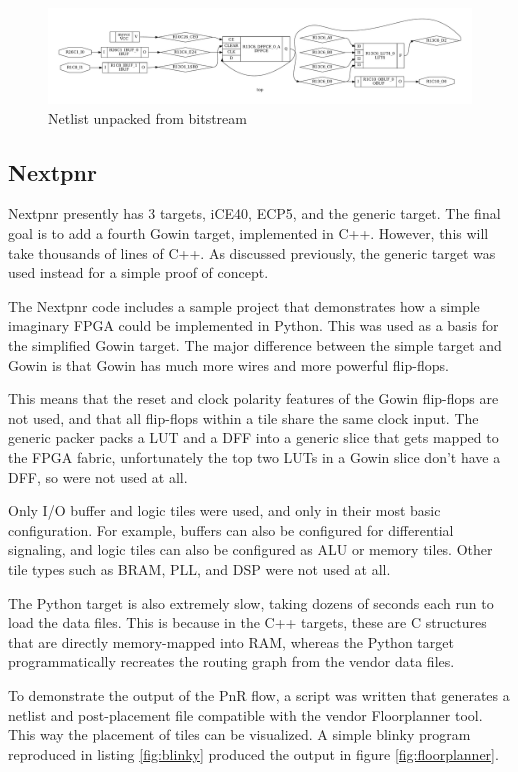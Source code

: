 \documentclass{article}
\begin{document}
\begin{figure}
    \centering
    \includegraphics[width=\textwidth]{fig/post_pnr.pdf}
    \caption{Netlist unpacked from bitstream}
    \label{fig:postpnr}
\end{figure}

\subsection{Nextpnr}

Nextpnr presently has 3 targets, iCE40, ECP5, and the generic target. The final goal is to add a fourth Gowin target, implemented in C++. However, this will take thousands of lines of C++. As discussed previously, the generic target was used instead for a simple proof of concept.

The Nextpnr code includes a sample project that demonstrates how a simple imaginary FPGA could be implemented in Python. This was used as a basis for the simplified Gowin target. The major difference between the simple target and Gowin is that Gowin has much more wires and more powerful flip-flops.

This means that the reset and clock polarity features of the Gowin flip-flops are not used, and that all flip-flops within a tile share the same clock input. The generic packer packs a LUT and a DFF into a generic slice that gets mapped to the FPGA fabric, unfortunately the top two LUTs in a Gowin slice don't have a DFF, so were not used at all.

Only I/O buffer and logic tiles were used, and only in their most basic configuration. For example, buffers can also be configured for differential signaling, and logic tiles can also be configured as ALU or memory tiles. Other tile types such as BRAM, PLL, and DSP were not used at all.

The Python target is also extremely slow, taking dozens of seconds each run to load the data files. This is because in the C++ targets, these are C structures that are directly memory-mapped into RAM, whereas the Python target programmatically recreates the routing graph from the vendor data files.

To demonstrate the output of the PnR flow, a script was written that generates a netlist and post-placement file compatible with the vendor Floorplanner tool. This way the placement of tiles can be visualized. A simple blinky program reproduced in listing \ref{fig:blinky} produced the output in figure \ref{fig:floorplanner}.
\end{document}

